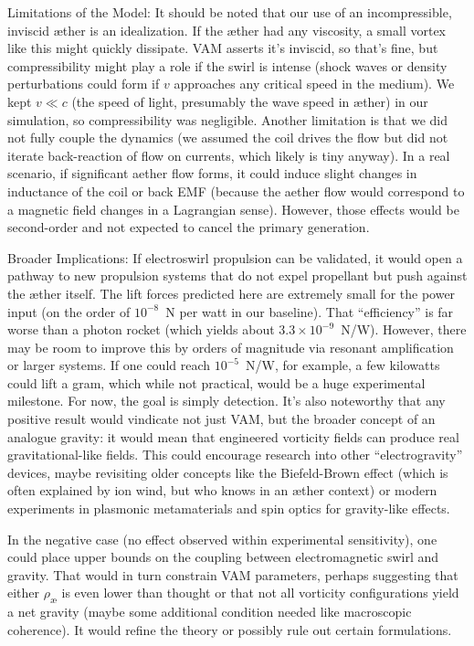 \documentclass[twocolumn,aps,pre,floatfix,nofootinbib]{revtex4-2}
\begin{document}
Limitations of the Model: It should be noted that our use of an incompressible, inviscid æther is an idealization. If the æther had any viscosity, a small vortex like this might quickly dissipate. VAM asserts it’s inviscid, so that’s fine, but compressibility might play a role if the swirl is intense (shock waves or density perturbations could form if $v$ approaches any critical speed in the medium). We kept $v \ll c$ (the speed of light, presumably the wave speed in æther) in our simulation, so compressibility was negligible. Another limitation is that we did not fully couple the dynamics (we assumed the coil drives the flow but did not iterate back-reaction of flow on currents, which likely is tiny anyway). In a real scenario, if significant aether flow forms, it could induce slight changes in inductance of the coil or back EMF (because the aether flow would correspond to a magnetic field changes in a Lagrangian sense). However, those effects would be second-order and not expected to cancel the primary generation.


Broader Implications: If electroswirl propulsion can be validated, it would open a pathway to new propulsion systems that do not expel propellant but push against the æther itself. The lift forces predicted here are extremely small for the power input (on the order of $10^{-8}$~N per watt in our baseline). That “efficiency” is far worse than a photon rocket (which yields about $3.3\times10^{-9}$~N/W). However, there may be room to improve this by orders of magnitude via resonant amplification or larger systems. If one could reach $10^{-5}$~N/W, for example, a few kilowatts could lift a gram, which while not practical, would be a huge experimental milestone. For now, the goal is simply detection. It’s also noteworthy that any positive result would vindicate not just VAM, but the broader concept of an analogue gravity: it would mean that engineered vorticity fields can produce real gravitational-like fields. This could encourage research into other “electrogravity” devices, maybe revisiting older concepts like the Biefeld-Brown effect (which is often explained by ion wind, but who knows in an æther context) or modern experiments in plasmonic metamaterials and spin optics for gravity-like effects.


In the negative case (no effect observed within experimental sensitivity), one could place upper bounds on the coupling between electromagnetic swirl and gravity. That would in turn constrain VAM parameters, perhaps suggesting that either $\rho_{\text{æ}}$ is even lower than thought or that not all vorticity configurations yield a net gravity (maybe some additional condition needed like macroscopic coherence). It would refine the theory or possibly rule out certain formulations.
\end{document}
